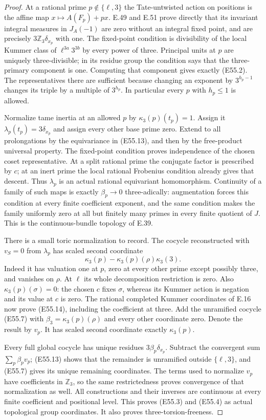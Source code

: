 \begin{proof}
At a rational prime $p\notin\{\ell,3\}$ the Tate-untwisted
action on positions is the affine map
$x\mapsto A(F_p)+px$. E.49 and E.51 prove directly that
its invariant integral measures in $J_A(-1)$ are zero
without an integral fixed point, and are precisely
$3\mathbb Z_3\delta_{x_p}$ with one. The fixed-point
condition is divisibility of the local Kummer class of
$\ell^{3a}3^{3b}$ by every power of three. Principal units
at $p$ are uniquely three-divisible; in its residue group
the condition says that the three-primary component is
one. Computing that component gives exactly (E55.2).
The representatives there are sufficient because changing
an exponent by $3^{h_p-1}$ changes its triple by a multiple
of $3^{h_p}$. In particular every $p$ with $h_p\le1$ is
allowed.

Normalize tame inertia at an allowed $p$ by
$\kappa_3(p)(t_p)=1$. Assign it
$\lambda_p(t_p)=3\delta_{x_p}$ and assign every other
base prime zero. Extend to all prolongations by the
equivariance in (E55.13), and then by the free-product
universal property. The fixed-point condition proves
independence of the chosen coset representative. At a
split rational prime the conjugate factor is prescribed
by $c$; at an inert prime the local rational Frobenius
condition already gives that descent. Thus $\lambda_p$
is an actual rational equivariant homomorphism.
Continuity of a family of such maps is exactly
$\beta_p\to0$ three-adically: augmentation forces this
condition at every finite coefficient exponent, and the
same condition makes the family uniformly zero at all
but finitely many primes in every finite quotient of $J$.
This is the continuous-bundle topology of E.39.

There is a small toric normalization to record. The
cocycle reconstructed with $v_S=0$ from $\lambda_p$
has scaled second coordinate
\[
             \kappa_3(p)-\kappa_3(p)(\rho)\kappa_3(3).
 \tag{E55.14}
\]
Indeed it has valuation one at $p$, zero at every other
prime except possibly three, and vanishes on $\rho$.
At $\ell$ its whole decomposition restriction is zero.
Also $\kappa_3(p)(\sigma)=0$: the chosen $c$ fixes
$\sigma$, whereas its Kummer action is negation and its
value at $c$ is zero. The rational completed Kummer
coordinates of E.16 now prove (E55.14), including the
coefficient at three. Add the unramified cocycle (E55.7)
with $\beta_3=\kappa_3(p)(\rho)$ and every other coordinate
zero. Denote the result by $v_p$. It has scaled second
coordinate exactly $\kappa_3(p)$.

Every full global cocycle has unique residues
$3\beta_p\delta_{x_p}$. Subtract the convergent sum
$\sum_p\beta_p v_p$; (E55.13) shows that the remainder
is unramified outside $\{\ell,3\}$, and (E55.7) gives its
unique remaining coordinates. The terms used to normalize
$v_p$ have coefficients in $\mathbb Z_3$, so the same
restrictedness proves convergence of that normalization
as well. All constructions and their inverses are
continuous at every finite coefficient and positional
level. This proves (E55.3) and (E55.4) as actual topological
group coordinates. It also proves three-torsion-freeness.


\end{proof}
